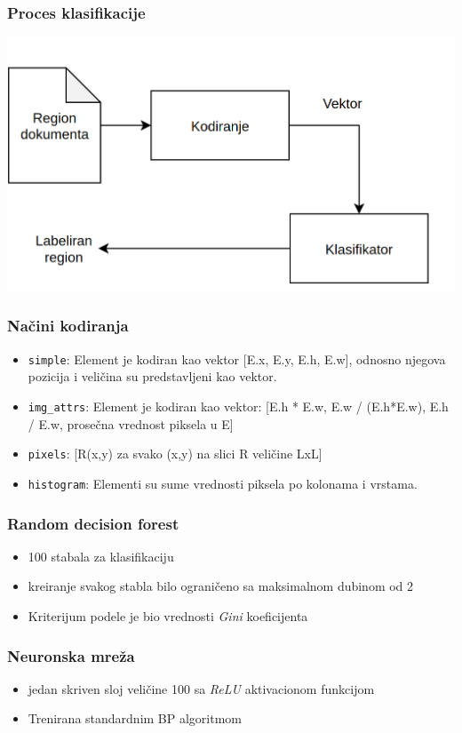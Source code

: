 \documentclass{beamer}
\begin{document}
\begin{frame}
	\frametitle{Proces klasifikacije}
	\includegraphics[width=\textwidth]{./png/classification.png}
\end{frame}

\begin{frame}
	\frametitle{Načini kodiranja}
	\begin{itemize}
		\item \texttt{simple}: Element je kodiran kao vektor [E.x, E.y, E.h, E.w], odnosno njegova pozicija i veličina su predstavljeni kao vektor.
		\item \texttt{img\_attrs}: Element je kodiran kao vektor:  [E.h * E.w, E.w / (E.h*E.w), E.h / E.w, prosečna vrednost piksela u E]
		\item \texttt{pixels}: [R(x,y) za svako (x,y) na slici R veličine LxL]
		\item \texttt{histogram}: Elementi su sume vrednosti piksela po kolonama i vrstama.
	\end{itemize}
\end{frame}


\begin{frame}
	\frametitle{Random decision forest}
	\begin{itemize}
		\item 100 stabala za klasifikaciju
		\item kreiranje svakog stabla bilo ograničeno sa maksimalnom dubinom od 2
		\item Kriterijum podele je bio vrednosti \textit{Gini} koeficijenta
	\end{itemize}
\end{frame}

\begin{frame}
	\frametitle{Neuronska mreža}
	\begin{itemize}
		\item jedan skriven sloj veličine 100 sa \textit{ReLU} aktivacionom funkcijom
		\item Trenirana standardnim BP algoritmom
	\end{itemize}
\end{frame}
\end{document}

